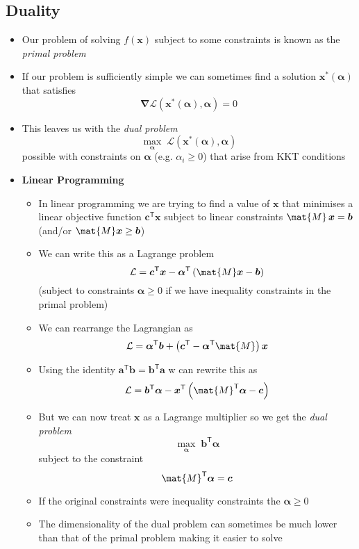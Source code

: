 \documentclass[11pt]{article}
\newcommand{\tr}{\textsf{T}}
\newcommand{\grad}{\bm{\nabla}}
\begin{document}
\subsection{Duality}
\label{sec:org7213653}
\begin{itemize}
\item Our problem of solving \(f(\bm{x})\) subject to some constraints is
known as the \emph{primal problem}
\item If our problem is sufficiently simple we can sometimes find a
solution \(\bm{x}^*(\bm{\alpha})\) that satisfies
$$ \grad  \mathcal{L}(\bm{x}^*(\bm{\alpha}),\bm{\alpha}) = 0 $$
\item This leaves us with the \emph{dual problem}
$$ \max_{\bm{\alpha}} \;
     \mathcal{L}(\bm{x}^*(\bm{\alpha}),\bm{\alpha}) $$
possible with constraints on \(\bm{\alpha}\) (e.g. \(\alpha_i\geq0\))
that arise from KKT conditions
\item \textbf{Linear Programming}
\begin{itemize}
\item In linear programming we are trying to find a value of \(\bm{x}\)
that minimises a linear objective function \(\bm{c}^\tr\bm{x}\)
subject to linear constraints \(\mat{M}\,\bm{x} = \bm{b}\)
(and/or \(\mat{M}\bm{x}\geq \bm{b}\))
\item We can write this as a Lagrange problem
$$ \mathcal{L} = \bm{c}^\tr \bm{x}  - \bm{\alpha}^\tr \left(
       \mat{M}\bm{x} - \bm{b}\right) $$
(subject to constraints \(\bm{\alpha}\geq0\) if we have
inequality constraints in the primal problem)
\item We can rearrange the Lagrangian as
$$ \mathcal{L} = \bm{\alpha}^\tr  \bm{b} + \left( \bm{c}^\tr - \bm{\alpha}^\tr \mat{M} \right) \bm{x} $$
\item Using the identity \(\bm{a}^\tr\bm{b} = \bm{b}^\tr \bm{a}\) w can rewrite this
as
$$ \mathcal{L} =  \bm{b}^\tr \bm{\alpha} - \bm{x}^\tr \left(\mat{M}^\tr \bm{\alpha} - \bm{c} \right) $$
\item But we can now treat \(\bm{x}\) as a Lagrange multiplier so we
get the \emph{dual problem}
$$ \max_{\bm{\alpha}} \; \bm{b}^\tr \bm{\alpha} $$
subject to the constraint
$$ \mat{M}^\tr \bm{\alpha} =  \bm{c} $$
\item If the original constraints were inequality constraints the \(\bm{\alpha}\geq0\)
\item The dimensionality of the dual problem can sometimes be much
lower than that of the primal problem making it easier to solve
\end{itemize}

\end{itemize}
\end{document}
